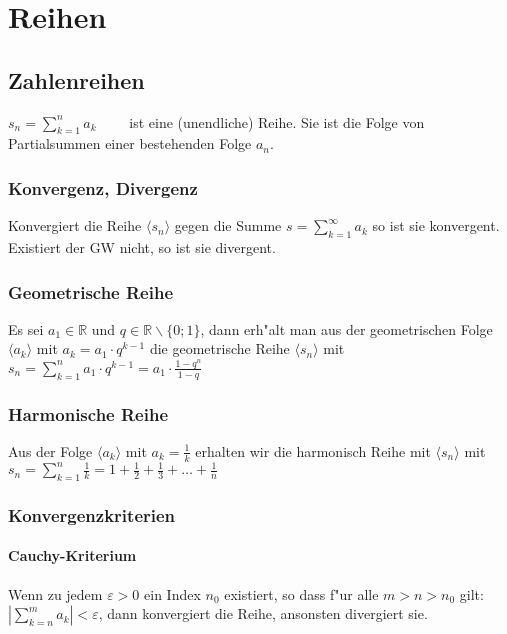 \section{Reihen}

\subsection{Zahlenreihen}
  $ s_n = \sum\limits_{k=1}^{n} a_k \qquad $ ist eine (unendliche) Reihe. Sie
  ist die Folge von Partialsummen einer bestehenden Folge $a_n$.

\subsubsection{Konvergenz, Divergenz}
Konvergiert die Reihe $\langle s_n \rangle$ gegen die Summe $ s =
\sum\limits_{k=1}^{\infty} a_k $ so ist sie konvergent. Existiert der GW nicht, so ist sie divergent.

\subsubsection{Geometrische Reihe}
Es sei $a_1\in\mathbb R$ und $q\in\mathbb R \backslash \{0;1\}$, dann erh"alt
man aus der geometrischen Folge $\langle a_k \rangle$ mit $a_k=a_1 \cdot
q^{k-1}$ die geometrische Reihe $\langle s_n \rangle$ mit
\textbf{$s_n= \sum\limits_{k=1}^{n} a_1 \cdot q^{k-1}=a_1 \cdot
\frac{1-q^n}{1-q}$\\}

\subsubsection{Harmonische Reihe}
Aus der Folge $\langle a_k \rangle$ mit $a_k=\frac{1}{k}$ erhalten wir die
harmonisch Reihe mit $\langle s_n \rangle$ mit
\textbf{$s_n=\sum\limits_{k=1}^{n}
\frac{1}{k}=1+\frac{1}{2}+\frac{1}{3}+\dotsc+\frac{1}{n}$}
\subsubsection{Konvergenzkriterien}

\paragraph{Cauchy-Kriterium} 
  Wenn zu jedem $\varepsilon > 0$ ein Index $n_0$ existiert, so dass f"ur alle
  $m > n > n_0$ gilt: \\ $\left| \sum\limits_{k=n}^m a_k \right| < \varepsilon$, dann konvergiert die Reihe, ansonsten divergiert sie.

